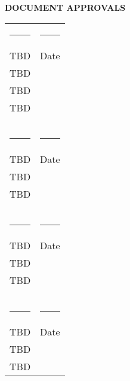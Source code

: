 
\begin{center}
\singlespace
   {\bfseries DOCUMENT APPROVALS}
		\vfill
\begin{tabular}{lc}
\rule[-0.075in]{3.5in}{0.5pt}  & \rule[-0.075in]{2.0in}{0.5pt}\\
TBD         &  Date\\	
TBD & \\
TBD & \\
TBD & \\ 
& \\%
& \\%
& \\%
\rule[-0.075in]{3.5in}{0.5pt}  & \rule[-0.075in]{2.0in}{0.5pt}\\
TBD         &  Date\\	
TBD & \\
TBD & \\
& \\%
& \\%
& \\%
\rule[-0.075in]{3.5in}{0.5pt}  & \rule[-0.075in]{2.0in}{0.5pt}\\
TBD         &  Date\\	
TBD & \\
TBD & \\
& \\%
& \\%
& \\%
\rule[-0.075in]{3.5in}{0.5pt}  & \rule[-0.075in]{2.0in}{0.5pt}\\
TBD         &  Date\\	
TBD & \\
TBD & \\													
\end{tabular}
\vfill
\end{center}


